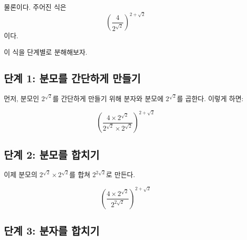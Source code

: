 \documentclass[
  letterpaper,
]{book}
\begin{document}
\begin{tcolorbox}[enhanced jigsaw, opacityback=0, opacitybacktitle=0.6, colback=white, rightrule=.15mm, coltitle=black, colframe=quarto-callout-note-color-frame, colbacktitle=quarto-callout-note-color!10!white, bottomrule=.15mm, bottomtitle=1mm, breakable, title=\textcolor{quarto-callout-note-color}{\faInfo}\hspace{0.5em}{프롬프트: 과정도 설명해줘.}, titlerule=0mm, leftrule=.75mm, toptitle=1mm, left=2mm, arc=.35mm, toprule=.15mm]

물론이다. 주어진 식은 \[
\left(\frac{4}{2^{\sqrt{2}}}\right)^{2+\sqrt{2}}
\]이다.

이 식을 단계별로 분해해보자.

\hypertarget{uxb2e8uxacc4-1-uxbd84uxbaa8uxb97c-uxac04uxb2e8uxd558uxac8c-uxb9ccuxb4e4uxae30}{%
\subsection*{단계 1: 분모를 간단하게
만들기}\label{uxb2e8uxacc4-1-uxbd84uxbaa8uxb97c-uxac04uxb2e8uxd558uxac8c-uxb9ccuxb4e4uxae30}}

먼저, 분모인 \(2^{\sqrt{2}}\)를 간단하게 만들기 위해 분자와 분모에
\(2^{\sqrt{2}}\)를 곱한다. 이렇게 하면:

\[
\left(\frac{4 \times 2^{\sqrt{2}}}{2^{\sqrt{2}} \times 2^{\sqrt{2}}}\right)^{2+\sqrt{2}}
\]

\hypertarget{uxb2e8uxacc4-2-uxbd84uxbaa8uxb97c-uxd569uxce58uxae30}{%
\subsection*{단계 2: 분모를
합치기}\label{uxb2e8uxacc4-2-uxbd84uxbaa8uxb97c-uxd569uxce58uxae30}}

이제 분모의 \(2^{\sqrt{2}} \times 2^{\sqrt{2}}\)를 합쳐
\(2^{2\sqrt{2}}\)로 만든다.

\[
\left(\frac{4 \times 2^{\sqrt{2}}}{2^{2\sqrt{2}}}\right)^{2+\sqrt{2}}
\]

\hypertarget{uxb2e8uxacc4-3-uxbd84uxc790uxb97c-uxd569uxce58uxae30}{%
\subsection*{단계 3: 분자를
합치기}\label{uxb2e8uxacc4-3-uxbd84uxc790uxb97c-uxd569uxce58uxae30}}


\end{tcolorbox}
\end{document}
